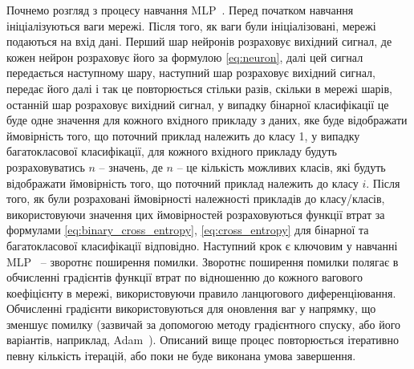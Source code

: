 Почнемо розгляд з  процесу навчання MLP~\cite{ct26}. Перед початком навчання ініціалізуються ваги мережі. Після того, як ваги були ініціалізовані, мережі подаються на вхід дані. Перший шар нейронів розраховує вихідний сигнал, де кожен нейрон розраховує його за формулою \ref{eq:neuron}, далі цей сигнал передається наступному шару, наступний шар розраховує вихідний сигнал, передає його далі і так це повторюється стільки разів, скільки в мережі шарів, останній шар розраховує вихідний сигнал, у випадку бінарної класифікації це буде одне значення для кожного вхідного прикладу з даних, яке буде відображати ймовірність того, що поточний приклад належить до класу 1, у випадку багатокласової класифікації, для кожного вхідного прикладу будуть розраховуватись $n$ -- значень, де $n$ -- це кількість можливих класів, які будуть відображати ймовірність того, що поточний приклад належить до класу $i$. Після того, як були розраховані ймовірності належності прикладів до класу/класів, використовуючи значення цих ймовірностей розраховуються функції втрат за формулами \ref{eq:binary_cross_entropy}, \ref{eq:cross_entropy} для бінарної та багатокласової класифікації відповідно. Наступний крок є ключовим у навчанні MLP~\cite{ct26} -- зворотнє поширення помилки. Зворотнє поширення помилки полягає в обчисленні градієнтів функції втрат по відношенню до кожного вагового коефіцієнту в мережі, використовуючи правило ланцюгового диференціювання. Обчисленні градієнти використовуються для оновлення ваг у напрямку, що зменшує помилку (зазвичай за допомогою методу градієнтного спуску, або його варіантів, наприклад, Adam~\cite{ct9}). Описаний вище процес повторюється ітеративно певну кількість ітерацій, або поки не буде виконана умова завершення.

